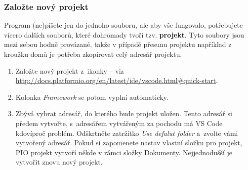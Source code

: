  \label{vsc:newproject} \subsubsection{Založte nový projekt}
 
 Program (ne)píšete jen do jednoho souboru, ale aby vše fungovalo, potřebujete vícero dalších souborů, které dohromady tvoří tzv. {\bf projekt}.
 Tyto soubory jsou mezi sebou hodně provázané, takže v případě přesunu projektu například z kroužku domů je potřeba zkopírovat celý adresář projektu. 

 
 
 
 \begin{enumerate}
 	\item Založte nový projekt z~ikonky  -- viz \url{http://docs.platformio.org/en/latest/ide/vscode.html\#quick-start}.
 	\item {}
 	Kolonka {\it Framework } se potom vyplní automaticky. 
 	\item  Zbývá vybrat adresář, do kterého bude projekt uložen.
 	Tento adresář si předem vytvořte, s~adresářem vytvářeným za pochodu má VS Code kdovíproč problém.
 	Odškrtněte zatržítko {\it Use defalut folder} a~zvolte vámi vytvořený adresář. Pokud si zapomenete nastav vlastní složku pro projekt, PIO projekt vytvoří někde v rámci složky Dokumenty. Nejjednodušší je vytvořit znovu nový projekt.
 \end{enumerate}
 
